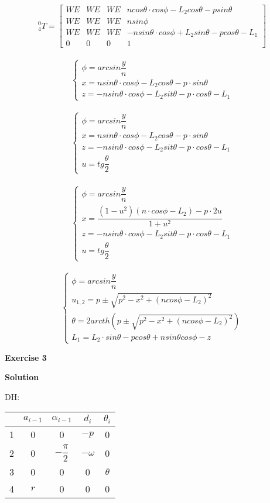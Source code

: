\documentclass[12pt]{article}
\begin{document}
\[^0_{4}T=\left[
\begin{array}{cccc}
WE & WE& WE & ncos\theta\cdot cos\phi-L_2 cos\theta-psin\theta \\
WE & WE & WE & nsin\phi\\
WE & WE& WE & -nsin\theta\cdot cos\phi+L_2 sin\theta -pcos\theta -L_1 \\
0 & 0 & 0 & 1
\end{array} \right]\]
\ 
\[\left\{
\begin{array}{l}
\phi=arcsin\dfrac{y}{n}\\
 x = nsin\theta \cdot cos\phi - L_2 cos\theta -p\cdot sin\theta\\
 z=-nsin\theta\cdot cos\phi - L_2sit\theta -p\cdot cos\theta - L_1
\end{array} \right.\]
\ 
\[\left\{
\begin{array}{l}
\phi=arcsin\dfrac{y}{n}\\
 x = nsin\theta \cdot cos\phi - L_2 cos\theta -p\cdot sin\theta\\
 z=-nsin\theta\cdot cos\phi - L_2sit\theta -p\cdot  cos\theta - L_1\\
 u=tg\dfrac{\theta}{2}
\end{array} \right.\]
\ 
\[\left\{
\begin{array}{l}
\phi=arcsin\dfrac{y}{n}\\
 x = \dfrac{(1-u^2)(n\cdot cos\phi-L_2)-p\cdot 2u}{1+u^2}\\
 z=-nsin\theta\cdot cos\phi - L_2sit\theta -p\cdot  cos\theta - L_1\\
 u=tg\dfrac{\theta}{2}
\end{array} \right.\]
\ 
\[\left\{
\begin{array}{l}
\phi=arcsin\dfrac{y}{n}\\
 u_{1,2}=p\pm \sqrt{p^2-x^2+(ncos\phi-L_2)^2}\\
 \theta=2arcth(p\pm \sqrt{p^2-x^2+(ncos\phi-L_2)^2})\\
 L_1=L_2\cdot sin\theta -pcos\theta +nsin\theta cos\phi -z
\end{array} \right.\]

\textbf{Exercise 3}	
\newpage	
		
\textbf{Solution}

DH:
\\
\begin{tabular}{| c|c|c|c|c|}
\hline
 & $a_{i-1}$ & $\alpha_{i-1}$ & $d_i$ & $\theta_i$ \\
 \hline
 1 & 0 & 0 & $-p$ & 0\\
 \hline
 2 & 0 & $-\dfrac{\pi}{2}$ & $-\omega$ & 0\\
 \hline
 3 & 0 & 0 & 0 & $\theta$\\
 \hline
 4 & $r$ & 0 & 0 & 0\\
 \hline
\end{tabular}
\end{document}
